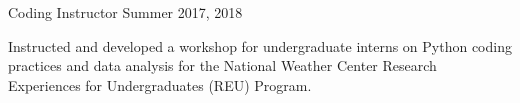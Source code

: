 \begin{cventries}
  \cventry
    {Coding Instructor} %
    {} %
    {} %
    {Summer 2017, 2018} %
    {
      \begin{cvitems} %
        \item {Instructed and developed a workshop for undergraduate interns on Python coding practices and data analysis for the National Weather Center Research Experiences for Undergraduates (REU) Program.}
      \end{cvitems}
    }    
\end{cventries}
